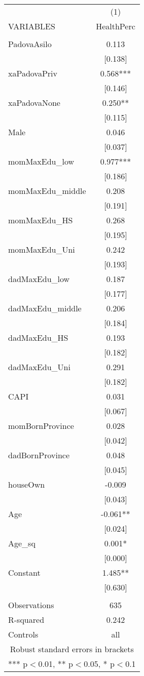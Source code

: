 \documentclass[]{article}
\begin{document}
\begin{tabular}{lc} \hline
 & (1) \\
VARIABLES & HealthPerc \\ \hline
 &  \\
PadovaAsilo & 0.113 \\
 & [0.138] \\
xaPadovaPriv & 0.568*** \\
 & [0.146] \\
xaPadovaNone & 0.250** \\
 & [0.115] \\
Male & 0.046 \\
 & [0.037] \\
momMaxEdu\_low & 0.977*** \\
 & [0.186] \\
momMaxEdu\_middle & 0.208 \\
 & [0.191] \\
momMaxEdu\_HS & 0.268 \\
 & [0.195] \\
momMaxEdu\_Uni & 0.242 \\
 & [0.193] \\
dadMaxEdu\_low & 0.187 \\
 & [0.177] \\
dadMaxEdu\_middle & 0.206 \\
 & [0.184] \\
dadMaxEdu\_HS & 0.193 \\
 & [0.182] \\
dadMaxEdu\_Uni & 0.291 \\
 & [0.182] \\
CAPI & 0.031 \\
 & [0.067] \\
momBornProvince & 0.028 \\
 & [0.042] \\
dadBornProvince & 0.048 \\
 & [0.045] \\
houseOwn & -0.009 \\
 & [0.043] \\
Age & -0.061** \\
 & [0.024] \\
Age\_sq & 0.001* \\
 & [0.000] \\
Constant & 1.485** \\
 & [0.630] \\
 &  \\
Observations & 635 \\
R-squared & 0.242 \\
 Controls & all \\ \hline
\multicolumn{2}{c}{ Robust standard errors in brackets} \\
\multicolumn{2}{c}{ *** p$<$0.01, ** p$<$0.05, * p$<$0.1} \\
\end{tabular}
\end{document}

